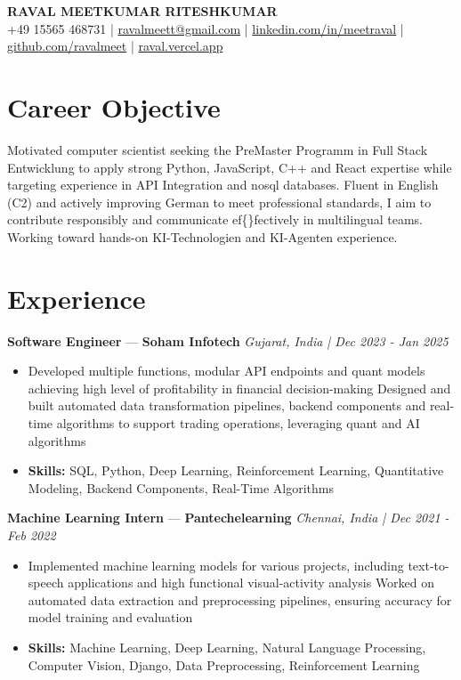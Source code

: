 \documentclass[a4paper,10pt]{article}
\begin{document}
\begin{center}
  {\Large\bfseries RAVAL MEETKUMAR RITESHKUMAR}\\[2pt]
  {\small +49 15565 468731 \;|\; \href{mailto:ravalmeett@gmail.com}{ravalmeett@gmail.com} \;|\; \href{https://www.linkedin.com/in/meetraval/}{linkedin.com/in/meetraval} \;|\; \href{https://github.com/ravalmeet}{github.com/ravalmeet} \;|\; \href{https://raval.vercel.app/}{raval.vercel.app}}
\end{center}
\vspace{-3pt}

\section*{Career Objective}
Motivated computer scientist seeking the PreMaster Programm in Full Stack Entwicklung to apply strong Python, JavaScript, C++ and React expertise while targeting experience in API Integration and nosql databases. Fluent in English (C2) and actively improving German to meet professional standards, I aim to contribute responsibly and communicate ef\{\}fectively in multilingual teams. Working toward hands-on KI-Technologien and KI-Agenten experience.\par

\section*{Experience}
\textbf{Software Engineer} — \textbf{Soham Infotech} \hfill \textit{Gujarat, India \;|\; Dec 2023 - Jan 2025}\par
\vspace{1pt}
\begin{itemize}
  \item Developed multiple functions, modular API endpoints and quant models achieving high level of profitability in financial decision-making Designed and built automated data transformation pipelines, backend components and real-time algorithms to support trading operations, leveraging quant and AI algorithms
  \item \textbf{Skills:} SQL, Python, Deep Learning, Reinforcement Learning, Quantitative Modeling, Backend Components, Real-Time Algorithms
\end{itemize}
\vspace{3pt}
\textbf{Machine Learning Intern} — \textbf{Pantechelearning} \hfill \textit{Chennai, India \;|\; Dec 2021 - Feb 2022}\par
\vspace{1pt}
\begin{itemize}
  \item Implemented machine learning models for various projects, including text-to-speech applications and high functional visual-activity analysis Worked on automated data extraction and preprocessing pipelines, ensuring accuracy for model training and evaluation
  \item \textbf{Skills:} Machine Learning, Deep Learning, Natural Language Processing, Computer Vision, Django, Data Preprocessing, Reinforcement Learning
\end{itemize}
\end{document}
